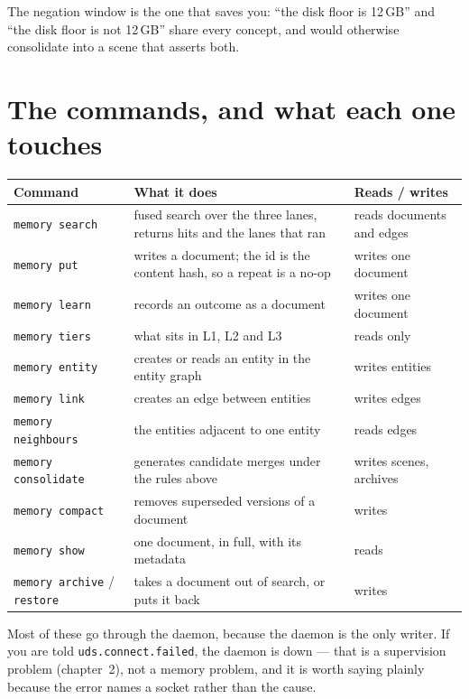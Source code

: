 The negation window is the one that saves you: ``the disk floor is 12\,GB'' and ``the disk floor is
not 12\,GB'' share every concept, and would otherwise consolidate into a scene that asserts both.

\section{The commands, and what each one touches}

\begin{longtable}{@{}p{}p{}p{}@{}}
  \toprule
  \textbf{Command} & \textbf{What it does} & \textbf{Reads / writes} \\
  \midrule
  \endhead
  \texttt{memory search} & fused search over the three lanes, returns hits and the lanes that ran & reads documents and edges \\
  \texttt{memory put} & writes a document; the id is the content hash, so a repeat is a no-op & writes one document \\
  \texttt{memory learn} & records an outcome as a document & writes one document \\
  \texttt{memory tiers} & what sits in L1, L2 and L3 & reads only \\
  \texttt{memory entity} & creates or reads an entity in the entity graph & writes entities \\
  \texttt{memory link} & creates an edge between entities & writes edges \\
  \texttt{memory neighbours} & the entities adjacent to one entity & reads edges \\
  \texttt{memory consolidate} & generates candidate merges under the rules above & writes scenes, archives \\
  \texttt{memory compact} & removes superseded versions of a document & writes \\
  \texttt{memory show} & one document, in full, with its metadata & reads \\
  \texttt{memory archive} / \texttt{restore} & takes a document out of search, or puts it back & writes \\
  \bottomrule
\end{longtable}

Most of these go through the daemon, because the daemon is the only writer. If you are told
\texttt{uds.connect.failed}, the daemon is down --- that is a supervision problem (chapter~2), not
a memory problem, and it is worth saying plainly because the error names a socket rather than the
cause.

